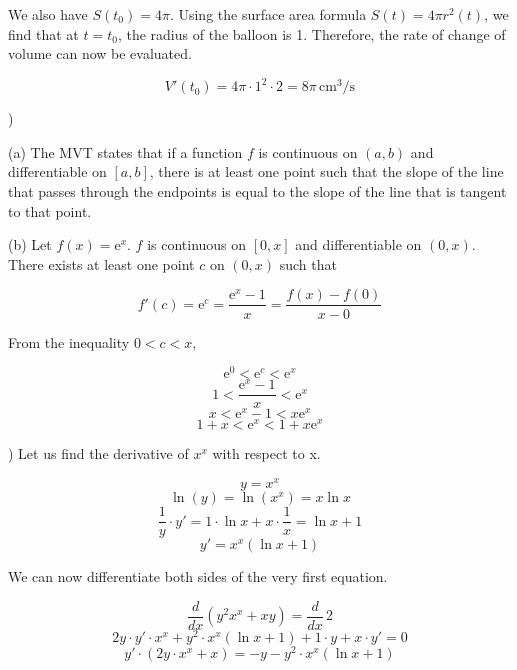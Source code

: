 \documentclass{article}
\begin{document}
\hfill

\noindent We also have $S(t_0) = 4\pi$. Using the surface area formula $S(t) = 4\pi r^2(t)$, we find that at $t=t_0$, the radius of the balloon is 1. Therefore, the rate of change of volume can now be evaluated.

\[V'(t_0)=4\pi\cdot1^2\cdot2=\boxed{8\pi\,\text{cm}^3\text{/s}}\]

\hfill

)

\hfill

\noindent (a) The MVT states that if a function $f$ is continuous on $(a,b)$ and differentiable on $[a,b]$, there is at least one point such that the slope of the line that passes through the endpoints is equal to the slope of the line that is tangent to that point.

\hfill

\noindent (b) Let $f(x)=\mathrm{e}^x$. $f$ is continuous on $[0,x]$ and differentiable on $(0,x)$.  There exists at least one point $c$ on $(0,x)$ such that

\begin{equation*}
f'(c) = \mathrm{e}^c=\frac{\mathrm{e}^x-1}x=\frac{f(x)-f(0)}{x-0}
\end{equation*}

\hfill

\noindent From the inequality $0<c<x$,

\begin{equation*}\mathrm{e}^0<\mathrm{e}^c<\mathrm{e}^x\end{equation*}
\begin{equation*}1<\frac{\mathrm{e}^x-1}x<\mathrm{e}^x\end{equation*}
\begin{equation*}x<\mathrm{e}^x-1 <x\mathrm{e}^x\end{equation*}
\begin{equation*}1+x<\mathrm{e}^x <1+x\mathrm{e}^x\end{equation*}

\hfill

) Let us find the derivative of $x^x$ with respect to x.

\[y=x^x\]
\[\ln(y)=\ln(x^x) = x\ln x\]
\[\frac1y\cdot y'=1\cdot\ln x + x\cdot \frac1x = \ln x +1\]
\[y'=x^x(\ln x+1)\]

\hfill

\noindent We can now differentiate both sides of the very first equation.

\[\frac d{dx}\left(y^2x^x + xy\right) = \frac d{dx}\,2\]
\[2y\cdot y'\cdot x^x + y^2\cdot x^x(\ln x+1)+1\cdot y +x\cdot y'=0\]
\[y'\cdot\left(2y\cdot x^x + x\right)=-y-y^2\cdot x^x(\ln x+1)\]
\end{document}
